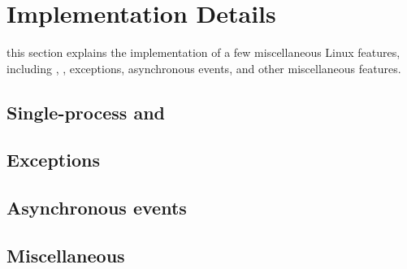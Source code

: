 \section{Implementation Details}

this section explains the \thelibos{} implementation
of a few miscellaneous Linux features, including , , exceptions, asynchronous events, and other miscellaneous features.


\subsection{Single-process  and }






\subsection{Exceptions}





\subsection{Asynchronous events}






\subsection{Miscellaneous}



